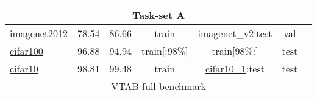\documentclass{article} \usepackage{iclr2023_conference,times}
\begin{document}
\begin{table*}[h]
\begin{tabular}{lcccccc}
\multicolumn{7}{c}{\textbf{Task-set A}} \\
\midrule

\href{https://www.tensorflow.org/datasets/catalog/imagenet2012}{imagenet2012}
&  78.54  &  86.66
& train & {\tiny \href{https://www.tensorflow.org/datasets/catalog/imagenet_v2}{imagenet\_v2}:}test & val
& \citep{Russakovsky2015ImageNetLS}
\\
\href{https://www.tensorflow.org/datasets/catalog/cifar100}{cifar100}
&  96.88  &  94.94
& train[{\tiny:98\%}] & train[{\tiny98\%:}] & test
& \citep{Krizhevsky2009LearningML}
\\
\href{https://www.tensorflow.org/datasets/catalog/cifar10}{cifar10}
&  98.81  &  99.48
& train & {\tiny \href{https://www.tensorflow.org/datasets/catalog/cifar10_1}{cifar10\_1}:}test & test
& \citep{Krizhevsky2009LearningML}
\\

\midrule
\multicolumn{7}{c}{VTAB-full benchmark} \\


\end{tabular}
\end{table*}
\end{document}
